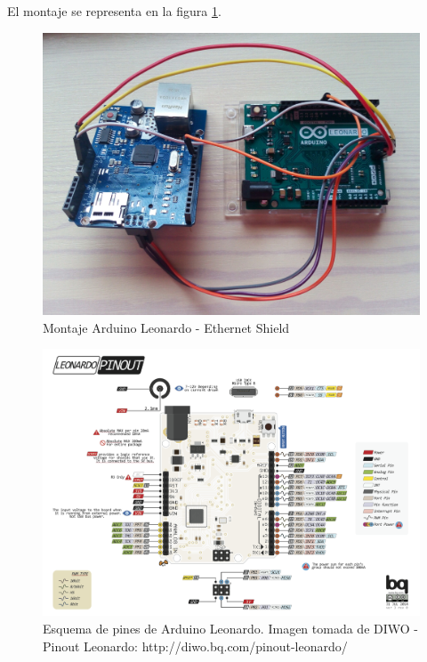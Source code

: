 El montaje se representa en la figura \ref{fig: montajethet}.

    \begin{figure}[H]
    \centering
    \includegraphics[scale = 0.13]{capitulo_04/figuras_dir/montajethernet.jpg}
    \caption{Montaje Arduino Leonardo - Ethernet Shield}
    \label{fig: montajethet}
    \end{figure}
    
    \begin{figure}
    \centering
    \includegraphics[scale = 0.4]{capitulo_04/figuras_dir/leonardo.jpg}
    \caption{Esquema de pines de Arduino Leonardo. Imagen tomada de DIWO - Pinout Leonardo: http://diwo.bq.com/pinout-leonardo/}
    \label{fig: pinout}
    \end{figure}
